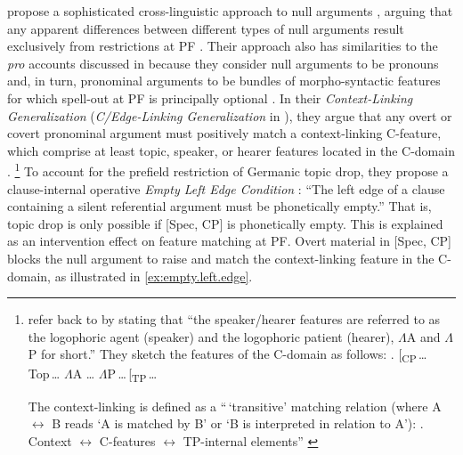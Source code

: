 \citet{sigurdsson.maling2010} propose a sophisticated cross\hyp linguistic approach to null arguments  \citep[see also][]{sigurdsson2011}, arguing that any apparent differences between different types of null arguments result exclusively from restrictions at PF \citep[66]{sigurdsson.maling2010}.
Their approach also has similarities to the \textit{pro}  accounts discussed in  because they consider null arguments to be pronouns and, in turn, pronominal arguments to be bundles of morpho-syntactic features for which spell-out at PF is principally optional \citep[68]{sigurdsson.maling2010}.
In their \textit{Context-Linking Generalization} \citep[61]{sigurdsson.maling2010} (\textit{C/Edge-Linking Generalization} in \citet[282]{sigurdsson2011}), they argue that any overt or covert pronominal argument must positively match a context-linking C-feature, which comprise at least topic, speaker, or hearer features located in the C-domain \citep[61]{sigurdsson.maling2010}.%
\footnote{\citet[61]{sigurdsson.maling2010} refer back to \citet{sigurdsson2004b,sigurdsson2004a} by stating that ``the speaker/hearer features are referred to as the logophoric agent (speaker) and the logophoric patient (hearer), $\Lambda$A and $\Lambda$P for short.'' 
They sketch the features of the C-domain as follows: 
\ex. [\textsubscript{CP}\,\dots\,\,Top\,\dots\,\,$\Lambda$A \dots\,\,$\Lambda$P\,\dots\,[\textsubscript{TP}\,\dots ~\citep[61]{sigurdsson.maling2010}

The context-linking is defined as a ``\,`transitive' matching relation (where A $\leftrightarrow$ B  reads `A is matched by B' or `B is interpreted in relation to A'):
\ex. Context $\leftrightarrow$ C-features $\leftrightarrow$ TP-internal elements'' \citep[61]{sigurdsson.maling2010}
}
To account for the prefield restriction of Germanic topic drop, they propose a clause-internal operative \textit{Empty Left Edge Condition} \citep[62]{sigurdsson.maling2010}: 
``The left edge of a clause containing a silent referential argument must be phonetically empty.''
That is, topic drop is only possible if [Spec, CP] is phonetically empty.
This is explained as an intervention effect on feature matching at PF.
Overt material in [Spec, CP] blocks the null argument to raise and match the context-linking feature in the C-domain,  as illustrated in \ref{ex:empty.left.edge}.

